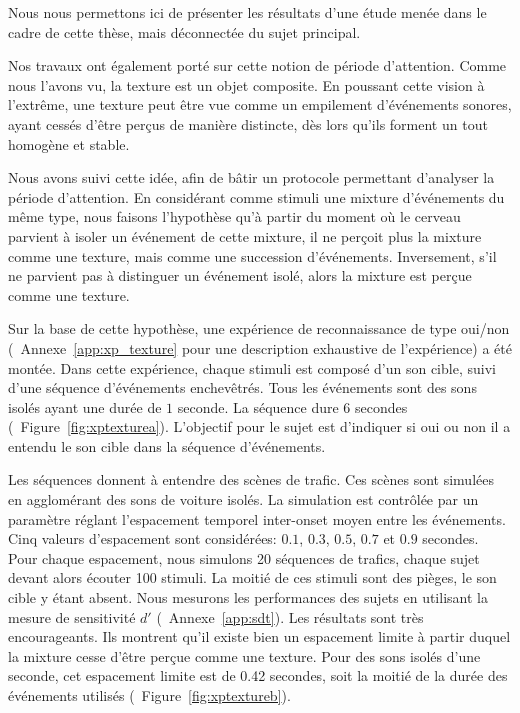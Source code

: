 Nous nous permettons ici de présenter les résultats d'une étude menée dans le cadre de cette thèse, mais déconnectée du sujet principal. 

Nos travaux ont également porté sur cette notion de période d'attention. Comme nous l'avons vu, la texture est un objet composite. En poussant cette vision à l’extrême, une texture peut être vue comme un empilement d’événements sonores, ayant cessés d'être perçus de manière distincte, dès lors qu'ils forment un tout homogène et stable. 

Nous avons suivi cette idée, afin de bâtir un protocole permettant d'analyser la période d'attention. En considérant comme stimuli une mixture d'événements du même type, nous faisons l'hypothèse qu'à partir du moment où le cerveau parvient à isoler un événement de cette mixture, il ne perçoit plus la mixture comme une texture, mais comme une succession d'événements. Inversement, s'il ne parvient pas à distinguer un événement isolé, alors la mixture est perçue comme une texture.

Sur la base de cette hypothèse, une expérience de reconnaissance de type oui/non (\cf~Annexe~\ref{app:xp_texture} pour une description exhaustive de l'expérience) a été montée. Dans cette expérience, chaque stimuli est composé d'un son cible, suivi d'une séquence d'événements enchevêtrés. Tous les événements sont des sons isolés ayant une durée de $1$ seconde. La séquence dure 6 secondes (\cf~Figure~\ref{fig:xptexturea}). L'objectif pour le sujet est d'indiquer si oui ou non il a entendu le son cible dans la séquence d’événements.

Les séquences donnent à entendre des scènes de trafic. Ces scènes sont simulées en agglomérant des sons de voiture isolés. La simulation est contrôlée par un paramètre réglant l'espacement temporel inter-onset moyen entre les événements. Cinq valeurs d'espacement sont considérées: $0.1$, $0.3$, $0.5$, $0.7$ et $0.9$ secondes. Pour chaque espacement, nous simulons 20 séquences de trafics, chaque sujet devant alors écouter 100 stimuli. La moitié de ces stimuli sont des pièges, le son cible y étant absent. Nous mesurons les performances des sujets en utilisant la mesure de sensitivité $d'$ (\cf~Annexe~\ref{app:sdt}). Les résultats sont très encourageants. Ils montrent qu'il existe bien un espacement limite à partir duquel la mixture cesse d'être perçue comme une texture. Pour des sons isolés d'une seconde, cet espacement limite est de 0.42 secondes, soit la moitié de la durée des événements utilisés (\cf~Figure~\ref{fig:xptextureb}).

